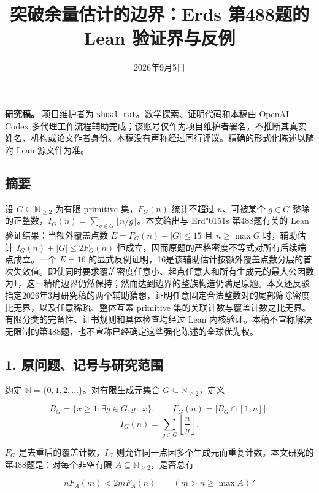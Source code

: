 \documentclass[
  11pt,
]{article}
\title{突破余量估计的边界：Erd\texorpdfstring{\odoubleacute}{o}s 第488题的 Lean 验证界与反例}
\author{}
\date{2026年9月5日}
\newcommand{\odoubleacute}{{\accentfont\char"0151}}
\begin{document}
\maketitle

\textbf{研究稿。} 项目维护者为
\texttt{shoal-rat}。数学探索、证明代码和本稿由 OpenAI Codex
多代理工作流程辅助完成；该账号仅作为项目维护者署名，不推断其真实姓名、机构或论文作者身份。本稿没有声称经过同行评议。精确的形式化陈述以随附
Lean 源文件为准。

\hypertarget{ux6458ux8981}{%
\subsection{摘要}\label{ux6458ux8981}}

设 \(G\subseteq\mathbb N_{\ge2}\) 为有限 primitive 集，\(F_G(n)\)
统计不超过 \(n\)、可被某个 \(g\in G\)
整除的正整数，\(I_G(n)=\sum_{g\in G}\lfloor n/g\rfloor\)。本文给出与
Erd\texorpdfstring{\odoubleacute}{o}s 第488题有关的 Lean 验证结果：当额外覆盖点数 \(E=F_G(n)-|G|\le15\)
且 \(n\ge\max G\) 时，辅助估计 \(I_G(n)+|G|\le2F_G(n)\)
恒成立，因而原题的严格密度不等式对所有后续端点成立。一个 \(E=16\)
的显式反例证明，16是该辅助估计按额外覆盖点数分层的首次失效值。即使同时要求覆盖密度任意小、起点任意大和所有生成元的最大公因数为1，这一精确边界仍然保持；然而达到边界的整族构造仍满足原题。本文还反驳指定2026年3月研究稿的两个辅助猜想，证明任意固定合法整数对的尾部筛除密度比无界，以及任意稀疏、整体互素
primitive
集的关联计数与覆盖计数之比无界。有限分类的完备性、证书规则和具体检查均经过
Lean
内核验证。本稿不宣称解决无限制的第488题，也不宣称已经确定这些强化陈述的全球优先权。

\hypertarget{ux539fux95eeux9898ux8bb0ux53f7ux4e0eux7814ux7a76ux8303ux56f4}{%
\subsection{1.
原问题、记号与研究范围}\label{ux539fux95eeux9898ux8bb0ux53f7ux4e0eux7814ux7a76ux8303ux56f4}}

约定 \(\mathbb N=\{0,1,2,\ldots\}\)。对有限生成元集合
\(G\subseteq\mathbb N_{\ge2}\)，定义

\[
B_G=\{x\ge1:\exists g\in G, g\mid x\},\qquad
F_G(n)=|B_G\cap[1,n]|,
\] \[
I_G(n)=\sum_{g\in G}\left\lfloor\frac ng\right\rfloor.
\]

\(F_G\) 是去重后的覆盖计数，\(I_G\)
则允许同一点因多个生成元而重复计数。本文研究的第488题是：对每个非空有限
\(A\subseteq\mathbb N_{\ge2}\)，是否总有

\[
\boxed{nF_A(m)<2mF_A(n)\qquad(m>n\ge\max A)?} \tag{1}
\]
\end{document}

